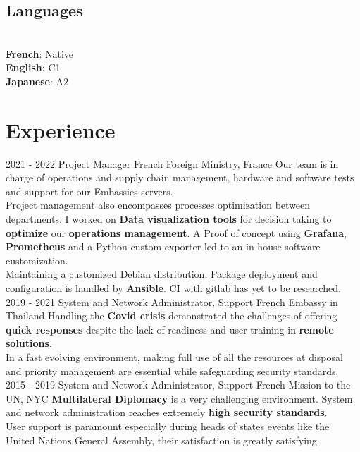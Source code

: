\documentclass[]{cv-class}
\begin{document}
\begin{aside}
  \section{Languages}
    \\
    \textbf{French}: Native\\
    \textbf{English}: C1\\
    \textbf{Japanese}: A2
    ~
\end{aside}

\vspace{0.4cm}
\section{Experience}
\begin{entrylist}
  \entry
    {2021 - 2022}
    {Project Manager}
    {French Foreign Ministry, France}
    {Our team is in charge of operations and supply chain management, hardware and software 	    tests and support for our Embassies servers.\\
    Project management also encompasses processes optimization between departments. I worked on \textbf{Data visualization tools} for decision taking to \textbf{optimize} our \textbf{operations management}.  A Proof of concept using \textbf{Grafana}, \textbf{Prometheus} and a Python custom exporter led to an in-house software customization.\\
    Maintaining a customized Debian distribution. Package deployment and configuration is handled by \textbf{Ansible}. CI with gitlab has yet to be researched.\\}
  \entry
    {2019 - 2021}
    {System and Network Administrator, Support}
    {French Embassy in Thailand}
    {Handling the \textbf{Covid crisis} demonstrated the challenges of offering \textbf{quick responses} despite the lack of readiness and user training in \textbf{remote solutions}.\\
    In a fast evolving environment, making full use of all the resources at disposal and priority management are essential while safeguarding security standards.\\}
  \entry
    {2015 - 2019}
    {System and Network Administrator, Support}
    {French Mission to the UN, NYC}
    {\textbf{Multilateral Diplomacy} is a very challenging environment.
    System and network administration reaches extremely \textbf{high security standards}.\\
    User support is paramount especially during heads of states events like the United Nations General Assembly, their satisfaction is greatly satisfying.\\
}
\end{entrylist}
\end{document}
